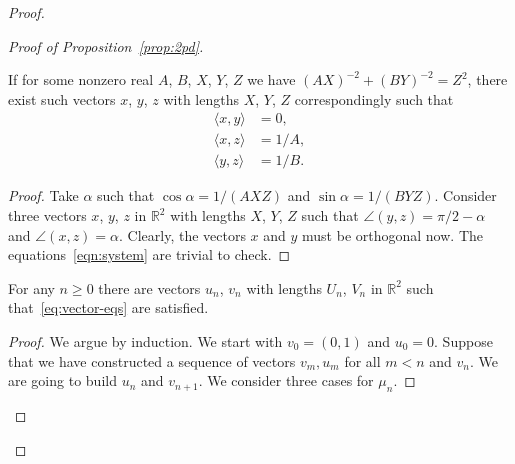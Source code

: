 \begin{proof}
\begin{proof}[Proof of Proposition~\ref{prop:2pd}]
        \begin{lemma}
          \label{lemma}
          If for some nonzero real $A$, $B$, $X$, $Y$, $Z$ we have $(AX)^{-2} + (BY)^{-2} = Z^2$, there exist such vectors $x$, $y$, $z$ with lengths
            $X$, $Y$, $Z$ correspondingly such that
          \begin{equation}
            \label{eqn:system}
            \begin{aligned}
              \langle x, y \rangle &= 0,\\
              \langle x, z \rangle &= 1/A,\\
              \langle y, z \rangle &= 1/B.
            \end{aligned}
          \end{equation}
        \end{lemma}
        \begin{proof}
          Take $\alpha$ such that $\cos \alpha  = 1/(AXZ)$ and $\sin \alpha  = 1/(BYZ)$.
          Consider three vectors $x$, $y$, $z$ in $\mathbb{R}^2$ with lengths $X$, $Y$, $Z$ such that
            $\angle(y, z) = \pi/2 - \alpha$ and $\angle(x, z) = \alpha$.
          Clearly, the vectors $x$ and $y$ must be orthogonal now.
          The equations~\eqref{eqn:system} are trivial to check.
        \end{proof}
        \begin{prop}
          For any $n\geq 0$ there are vectors $u_n$, $v_n$ with lengths $U_n$, $V_n$ in $\mathbb{R}^2$ such that~\eqref{eq:vector-eqs} are satisfied.
        \end{prop}
        \begin{proof}
          We argue by induction.
          We start with $v_0 = (0, 1)$ and $u_0 = 0$.
          Suppose that we have constructed a sequence of vectors $v_m, u_m$ for all $m < n$ and $v_n$.
          We are going to build $u_n$ and $v_{n+1}$.
          We consider three cases for $\mu_n$.


\end{proof}
\end{proof}
\end{proof}
